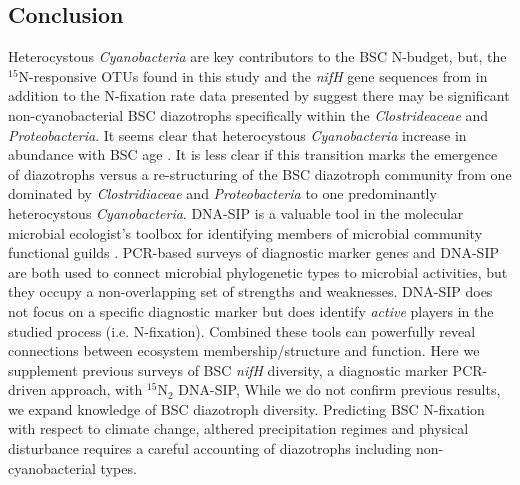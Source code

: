 \subsection{Conclusion}
Heterocystous \textit{Cyanobacteria} are key contributors to the BSC N-budget,
but, the $^{15}$N-responsive OTUs found in this study and the \textit{nifH}
gene sequences from \citet{Steppe_1996} in addition to the N-fixation rate data
presented by \citet{15643930} suggest there may be significant
non-cyanobacterial BSC diazotrophs specifically within the
\textit{Clostrideaceae} and \textit{Proteobacteria}. It seems clear that
heterocystous \textit{Cyanobacteria} increase in abundance with BSC age
\citep{14766579}. It is less clear if this transition marks the emergence of
diazotrophs versus a re-structuring of the BSC diazotroph community from one
dominated by \textit{Clostridiaceae} and \textit{Proteobacteria} to one
predominantly heterocystous \textit{Cyanobacteria}. DNA-SIP is a valuable tool
in the molecular microbial ecologist's toolbox for identifying members of
microbial community functional guilds \citep{17446886}. PCR-based surveys of
diagnostic marker genes and DNA-SIP are both used to connect microbial
phylogenetic types to microbial activities, but they occupy a non-overlapping
set of strengths and weaknesses. DNA-SIP does not focus on a specific diagnostic
marker but does identify \textit{active} players in the studied process (i.e. 
N-fixation). Combined these tools can powerfully reveal connections between
ecosystem membership/structure and function. Here we supplement previous
surveys of BSC \textit{nifH} diversity, a diagnostic marker PCR-driven
approach, with $^{15}$N$_{2}$ DNA-SIP, While we do not confirm previous
results, we expand knowledge of BSC diazotroph diversity.  Predicting BSC
N-fixation with respect to climate change, althered precipitation regimes and
physical disturbance requires a careful accounting of diazotrophs including
non-cyanobacterial types. 
